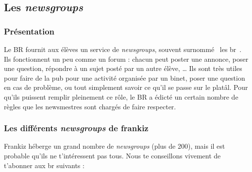 \subsection{Les \emph{newsgroups}}
\label{newsgroups}
\subsubsection{Présentation}
Le BR fournit aux élèves un service de \emph{newsgroups}, souvent surnommé \guillemotleft~les br~\guillemotright . Ils fonctionnent un peu comme un
forum : chacun peut poster une annonce, poser une question,
 répondre à un sujet posté par un autre élève, \ldots 
Ils sont très utiles pour faire de la pub pour une activité
organisée par un binet, poser une question en cas de problème, ou
tout simplement savoir ce qu'il se passe sur le platâl. Pour qu'ils
puissent remplir pleinement ce rôle, le BR a édicté un certain
nombre de règles que les newsmestres sont chargés de faire
respecter.

\subsubsection{Les différents \emph{newsgroups} de frankiz}
Frankiz héberge un grand nombre de \emph{newsgroups} (plus de 200), mais il est probable qu'ils ne t'intéressent pas tous.
Nous te conseillons vivement de t'abonner aux br suivants :

